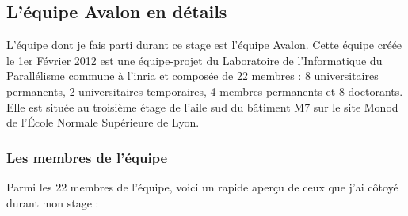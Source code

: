 \subsection{L'équipe Avalon en détails}
L'équipe dont je fais parti durant ce stage est l'équipe Avalon. Cette équipe créée le 1er Février 2012 \cite{avalonAR2012} est une équipe-projet du Laboratoire de l'Informatique du Parallélisme commune à l'\gls{inria} et composée de 22 membres : 8 universitaires permanents, 2 universitaires temporaires, 4 membres permanents et 8 doctorants. Elle est située au troisième étage de l'aile sud du bâtiment M7 sur le site Monod de l'École Normale Supérieure de Lyon.

\subsubsection{Les membres de l'équipe}
Parmi les 22 membres de l'équipe, voici un rapide aperçu de ceux que j'ai côtoyé durant mon stage :\\

